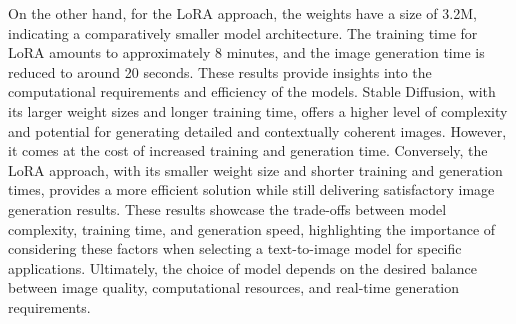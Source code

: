 \documentclass[conference]{IEEEtran}
\begin{document}
On the other hand, for the LoRA approach, the weights have a size of 3.2M, indicating a comparatively smaller model architecture. The training time for LoRA amounts to approximately 8 minutes, and the image generation time is reduced to around 20 seconds.
These results provide insights into the computational requirements and efficiency of the models. Stable Diffusion, with its larger weight sizes and longer training time, offers a higher level of complexity and potential for generating detailed and contextually coherent images. However, it comes at the cost of increased training and generation time. Conversely, the LoRA approach, with its smaller weight size and shorter training and generation times, provides a more efficient solution while still delivering satisfactory image generation results.
These results showcase the trade-offs between model complexity, training time, and generation speed, highlighting the importance of considering these factors when selecting a text-to-image model for specific applications. Ultimately, the choice of model depends on the desired balance between image quality, computational resources, and real-time generation requirements.

%
%
\printbibliography[heading=bibintoc]
\end{document}
